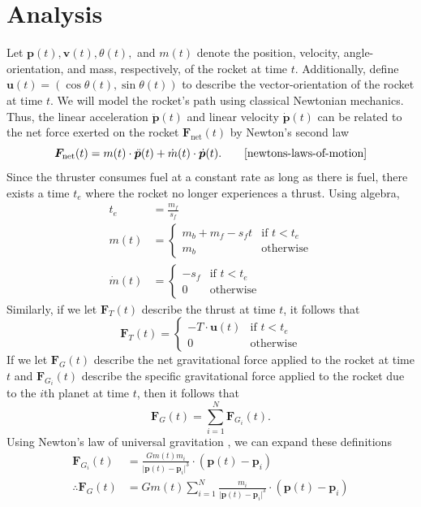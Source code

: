 \documentclass{article}
\begin{document}
\section{Analysis}
Let $\bm{p}(t), \bm{v}(t), \theta(t), $ and $m(t)$ denote the position, velocity, angle-orientation, and mass, respectively, of the rocket at time $t$. Additionally, define $\bm{u}(t) = (\cos\theta(t), \sin\theta(t))$ to describe the vector-orientation of the rocket at time $t$. We will model the rocket's path using classical Newtonian mechanics. Thus, the linear acceleration $\ddot{\bm{p}}(t)$ and linear velocity $\dot{\bm{p}}(t)$ can be related to the net force exerted on the rocket $\bm{F}_\text{net}(t)$ by Newton's second law 
\[
\bm{F}_{\text{net}}(t) = m(t) \cdot \ddot{\bm{p}}(t) + \dot{m}(t) \cdot \dot{\bm{p}}(t). \qquad\cite{newtons-laws-of-motion}
\]
Since the thruster consumes fuel at a constant rate as long as there is fuel, there exists a time $t_e$ where the rocket no longer experiences a thrust. Using algebra,
\begin{align*}
t_e &= \frac{m_f}{s_f}\\
m(t) &= \begin{cases}
    m_b + m_f - s_ft & \text{if } t < t_e\\
    m_b & \text{otherwise}
\end{cases}\\
\dot{m}(t) &= \begin{cases}
    -s_f & \text{if } t < t_e\\
    0 & \text{otherwise}
\end{cases}
\end{align*}
Similarly, if we let $\bm{F}_T(t)$ describe the thrust at time $t$, it follows that
\[
\bm{F}_T(t) = \begin{cases}
    -T \cdot \bm{u}(t) & \text{if } t < t_e\\
    0 & \text{otherwise}
\end{cases}
\]
If we let $\bm{F}_G(t)$ describe the net gravitational force applied to the rocket at time $t$ and $\bm{F}_{G_i}(t)$ describe the specific gravitational force applied to the rocket due to the $i$th planet at time $t$, then it follows that
\[
\bm{F}_G(t) = \sum_{i=1}^{N}\bm{F}_{G_i}(t).
\]
Using Newton's law of universal gravitation \cite{gehrels}, we can expand these definitions
\begin{align*}
\bm{F}_{G_i}(t) &= \frac{Gm(t)m_i}{\lvert \bm{p}(t) - \bm{p}_i \rvert^3} \cdot (\bm{p}(t) - \bm{p}_i)\\
\therefore \bm{F}_G(t) &= Gm(t)\sum_{i=1}^{N}\frac{m_i}{\lvert \bm{p}(t) - \bm{p}_i \rvert^3} \cdot (\bm{p}(t) - \bm{p}_i)
\end{align*}
\end{document}
